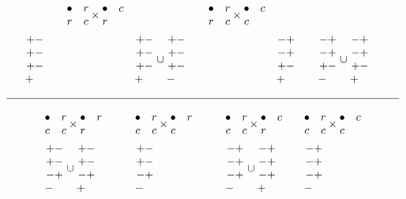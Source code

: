 \documentclass[11pt ,reqno]{amsart}
\begin{document}
\begin{example}
$$\begin{aligned}
&&\quad\begin{matrix} \bullet&r\\r&c\end{matrix}\times\begin{matrix}\bullet& c\\{r}& \end{matrix}
&&\quad\begin{matrix} \bullet&r\\r&c\end{matrix} \times\begin{matrix}\bullet&c\\{c}&\end{matrix}\\
&\begin{matrix} +-\\+-\\+-\\ {+}\quad \end{matrix}
&&\quad\begin{matrix} +-\\+-\\+-\\{+}\quad\end{matrix}\cup\begin{matrix}+-\\+-\\+-\\{-}\quad\end{matrix}
&&\quad\begin{matrix} -+\\-+\\+-\\{+}\quad\end{matrix}
&&\quad\begin{matrix} -+\\-+\\+-\\{-}\quad\end{matrix}\cup\begin{matrix}-+\\-+\\+-\\{+}\quad\end{matrix}
\end{aligned}
$$

$\line(1,0){360}$

$$
  \begin{aligned}
&  
\begin{matrix} \bullet &r\\c&c\end{matrix} \times\begin{matrix}\bullet &r\\{r}&& \end{matrix}&&\quad\begin{matrix} \bullet&
r\\c&c\end{matrix} \times\begin{matrix}\bullet& r\\ {c}&&\end{matrix}&&\quad\begin{matrix} \bullet&
r\\c&c\end{matrix}\times\begin{matrix}\bullet& c\\{r}& \end{matrix}&&\quad\begin{matrix} \bullet&
r\\c&c\end{matrix} \times\begin{matrix}\bullet&c\\{c}&\end{matrix}\\
&\begin{matrix} +-\\+-\\-+\\ {-}\quad\end{matrix}\cup\begin{matrix} +-\\+-\\-+\\{+}\quad\end{matrix}
&&\quad
\begin{matrix} +-\\+-\\-+\\ {-}\quad\end{matrix}
&&\quad
\begin{matrix} -+\\-+\\-+\\ {-}\quad\end{matrix}\cup\begin{matrix} -+\\-+\\-+\\ {+}\quad\end{matrix}
&&\quad
\begin{matrix} -+\\-+\\-+\\ {-}\quad\end{matrix}
\end{aligned}
$$
\end{example}
\end{document}
